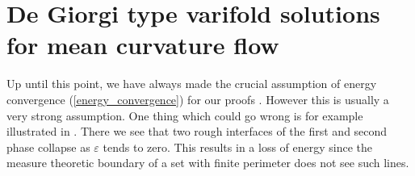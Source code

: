 \section{De Giorgi type varifold solutions for mean curvature flow}
\label{subsection_de_giorgi_type_varifold_solutions_for_mcf}

Up until this point, we have always made the crucial assumption of energy 
convergence (\ref{energy_convergence}) for our proofs .
However this is usually a very strong assumption. One thing which could go 
wrong is for example illustrated in 
. There we see that two rough interfaces of 
the first and second phase collapse as $ \varepsilon $ tends to zero. This 
results in a loss of energy since the measure theoretic boundary of a set with
finite perimeter does not see such lines.

